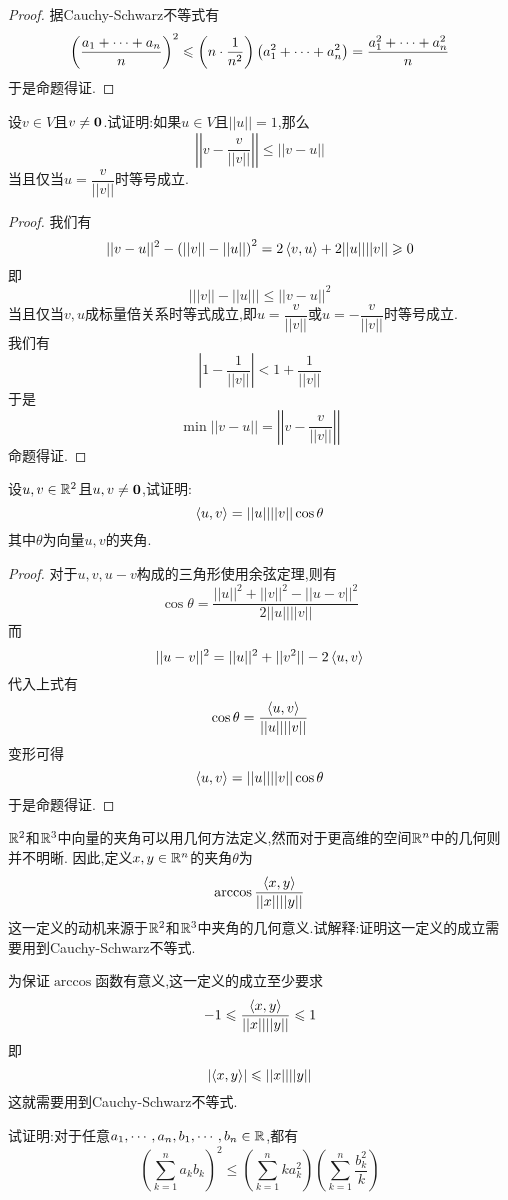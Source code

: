\documentclass{ctexart}
\begin{document}
\begin{proof}
    据Cauchy-Schwarz不等式有
    \[\left(\dfrac{{a}_1+\cdots+{a}_{n}}{n}\right)^2\leqslant\left(n\cdot\dfrac{1}{n^2}\right)\left(a_1^2+\cdots+a_n^2\right)=\dfrac{a_1^2+\cdots+a_n^2}{n}\]
    于是命题得证.
\end{proof}
\begin{problem}[14.]
    设$v\in V$且$v\neq\mathbf0$.试证明:如果$u\in V$且$||u||=1$,那么
    \[\left|\left|v-\dfrac{v}{||v||}\right|\right|\leqslant||v-u||\]
    当且仅当$u=\dfrac{v}{||v||}$时等号成立.
\end{problem}
\begin{proof}
    我们有
    \[||v-u||^2-\left(||v||-||u||\right)^2=2\left\langle{v},{u}\right\rangle+2||u||||v||\geqslant0\]
    即
    \[\left|||v||-||u||\right|\leqslant||v-u||^2\]
    当且仅当$v,u$成标量倍关系时等式成立,即$u=\dfrac{v}{||v||}$或$u=-\dfrac{v}{||v||}$时等号成立.\\
    我们有
    \[\left|1-\dfrac{1}{||v||}\right|<1+\dfrac{1}{||v||}\]
    于是
    \[\min||v-u||=\left|\left|v-\dfrac{v}{||v||}\right|\right|\]
    命题得证.
\end{proof}
\begin{problem}[15.]
    设$u,v\in\mathbb{R}^2$且$u,v\neq\mathbf0$,试证明:
    \[\left\langle{u},{v}\right\rangle=||u||||v||\cos\theta\]
    其中$\theta$为向量$u,v$的夹角.
\end{problem}
\begin{proof}
    对于$u,v,u-v$构成的三角形使用余弦定理,则有
    \[\cos\theta=\dfrac{||u||^2+||v||^2-||u-v||^2}{2||u||||v||}\]
    而
    \[||u-v||^2=||u||^2+||v^2||-2\left\langle{u},{v}\right\rangle\]
    代入上式有
    \[\cos\theta=\dfrac{\left\langle{u},{v}\right\rangle}{||u||||v||}\]
    变形可得
    \[\left\langle{u},{v}\right\rangle=||u||||v||\cos\theta\]
    于是命题得证.
\end{proof}
\begin{problem}[16.]
    $\mathbb{R}^2$和$\mathbb{R}^3$中向量的夹角可以用几何方法定义,然而对于更高维的空间$\mathbb{R}^n$中的几何则并不明晰.
    因此,定义$x,y\in\mathbb{R}^n$的夹角$\theta$为
    \[\arccos\dfrac{\left\langle{x},{y}\right\rangle}{||x||||y||}\]
    这一定义的动机来源于$\mathbb{R}^2$和$\mathbb{R}^3$中夹角的几何意义.试解释:证明这一定义的成立需要用到Cauchy-Schwarz不等式.
\end{problem}
\begin{solution}
    为保证$\arccos$函数有意义,这一定义的成立至少要求
    \[-1\leqslant\dfrac{\left\langle{x},{y}\right\rangle}{||x||||y||}\leqslant 1\]
    即
    \[\left|\left\langle{x},{y}\right\rangle\right|\leqslant||x||||y||\]
    这就需要用到Cauchy-Schwarz不等式.
\end{solution}
\begin{problem}[17.]
    试证明:对于任意${a}_1,\cdots,{a}_{n},{b}_1,\cdots,{b}_{n}\in\mathbb{R}$,都有
    \[\left(\sum_{k=1}^{n}a_kb_k\right)^2\leqslant\left(\sum_{k=1}^{n}ka_k^2\right)\left(\sum_{k=1}^{n}\dfrac{b_k^2}{k}\right)\]
\end{problem}
\end{document}
